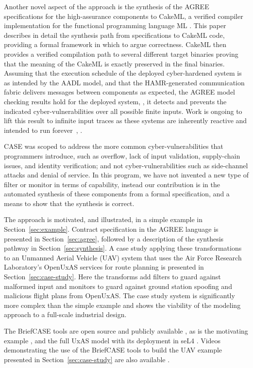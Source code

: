 Another novel aspect of the approach is the synthesis of the AGREE specifications for the high-assurance components to CakeML, a verified compiler implementation for the functional programming language ML \cite{cakeml}. This paper describes in detail the synthesis path from specifications to CakeML code, providing a formal framework in which to argue correctness. CakeML then provides a verified compilation path to several different target binaries proving that the meaning of the CakeML is exactly preserved in the final binaries. Assuming that the execution schedule of the deployed cyber-hardened system is as intended by the AADL model, and that the HAMR-generated communication fabric delivers messages between components as expected, the AGREE model checking results hold for the deployed system, \ie, it detects and prevents the indicated cyber-vulnerabilities over all possible finite inputs. Work is ongoing to lift this result to infinite input traces as these systems are inherently reactive and intended to run forever~\cite{case-verified-filter}, \cite{cakeml-space-cost}.

CASE was scoped to address the more common cyber-vulnerabilities that programmers introduce, such as overflow, lack of input validation, supply-chain issues, and identity verification; and not cyber-vulnerabilities such as side-channel attacks and denial of service.
In this program, we have not invented a new type of filter or monitor in terms of capability, instead our contribution is in the automated synthesis of these components from a formal specification, and a means to show that the synthesis is correct.

The approach is motivated, and illustrated, in a simple example in Section~\ref{sec:example}. Contract specification in the AGREE language is presented in Section~\ref{sec:agree}, followed by a description of the synthesis pathway in Section~\ref{sec:synthesis}. A case study applying these transformations to an Unmanned Aerial Vehicle (UAV) system that uses the Air Force Research Laboratory's OpenUxAS services for route planning is presented in Section~\ref{sec:case-study}. Here the transforms add filters to guard against malformed input and monitors to guard against ground station spoofing and malicious flight plans from OpenUxAS. The case study system is significantly more complex than the simple example and shows the viability of the modeling approach to a full-scale industrial design. 

The BriefCASE tools are open source and publicly available \cite{fmide}, as is the motivating example \cite{repo}, and the full UxAS model with its deployment in seL4 \cite{phase2, camkes}.  Videos demonstrating the use of the BriefCASE tools to build the UAV example presented in Section~\ref{sec:case-study} are also available \cite{case}. 
